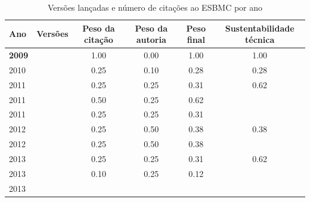\begin{table}[H]
\caption{Versões lançadas e número de citações ao ESBMC por ano}
\centering
\begin{tabular}{| l | c | c | c | c | c |}
  \hline
  Ano & Versões & Peso da citação & Peso da autoria & Peso final & Sustentabilidade técnica \\
  \hline
            {\bf 2009}
          &
          
          &
          1.00
          &
          0.00
          &
          1.00
          &
            {\color{blue} 1.00}
          \\
\hline
            2010
          &
          
          &
          0.25
          &
          0.10
          &
          0.28
          &
            {\color{red} 0.28}
          \\
\hline
            2011
          &
          
          &
          0.25
          &
          0.25
          &
          0.31
          &
            {\color{blue} 0.62}
          \\
            2011
          &
          
          &
          0.50
          &
          0.25
          &
          0.62
          &
          \\
            2011
          &
          
          &
          0.25
          &
          0.25
          &
          0.31
          &
          \\
\hline
            2012
          &
          
          &
          0.25
          &
          0.50
          &
          0.38
          &
            {\color{red} 0.38}
          \\
            2012
          &
          
          &
          0.25
          &
          0.50
          &
          0.38
          &
          \\
\hline
            2013
          &
          
          &
          0.25
          &
          0.25
          &
          0.31
          &
            {\color{blue} 0.62}
          \\
            2013
          &
          
          &
          0.10
          &
          0.25
          &
          0.12
          &
          \\
            2013
          &
          

\end{tabular}
\end{table}
